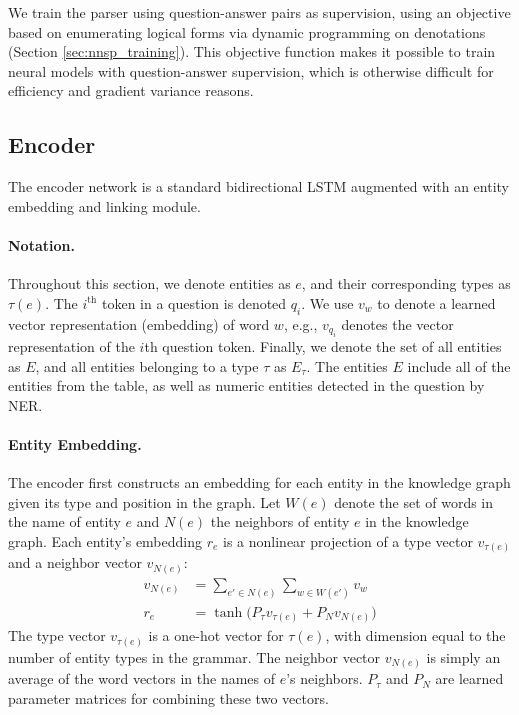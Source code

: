 We train the parser using question-answer pairs as supervision, using an 
objective based on enumerating logical forms via dynamic programming on 
denotations \citep{pasupat2016inferring} (Section \ref{sec:nnsp_training}). This 
objective function makes it possible to train neural models with 
question-answer supervision, which is otherwise difficult for efficiency and 
gradient variance reasons.

\subsection{Encoder}
\label{sec:nnsp_encoder}

The encoder network is a standard bidirectional LSTM augmented with an entity 
embedding and linking module.

\paragraph{Notation.}
Throughout this section, we denote entities as $e$, and their corresponding 
types as $\tau(e)$. The $i^{\text{th}}$ token in a question is denoted $q_i$. 
We use $v_w$ to denote a learned vector representation (embedding) of word $w$, 
e.g., $v_{q_i}$ denotes the vector representation of the $i$th question token. 
Finally, we denote the set of all entities as $E$, and all entities belonging 
to a type $\tau$ as $E_{\tau}$. The entities $E$ include all of the entities 
from the table, as well as numeric entities detected in the question by NER. 

\paragraph{Entity Embedding.}
The encoder first constructs an embedding for each entity in the knowledge 
graph given its type and position in the graph. 
Let $W(e)$ denote the set of words in the name of entity $e$ and $N(e)$ the 
neighbors of entity $e$ in the knowledge graph.
Each entity's embedding $r_e$ is a nonlinear projection of a type vector 
$v_{\tau(e)}$ and a neighbor vector $v_{N(e)}$:
\begin{align}
    v_{N(e)} &= \sum_{e' \in N(e)}\sum_{w \in W(e')}v_w \\
    r_e &= \tanh\big(P_\tau v_{\tau(e)} + P_N v_{N(e)}\big)
\end{align}
The type vector $v_{\tau(e)}$ is a one-hot vector for $\tau(e)$, with dimension 
equal to the number of entity types in the grammar. The neighbor vector 
$v_{N(e)}$ is simply an average of the word vectors in the names of $e$'s 
neighbors. $P_\tau$ and $P_N$ are learned parameter matrices for combining 
these two vectors.

